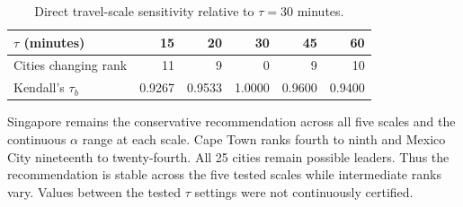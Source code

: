 \begin{table}[htbp]
\centering
\caption{Direct travel-scale sensitivity relative to $\tau=30$ minutes.}
\label{tab:t4sensitivity}
\begin{tabular}{lrrrrr}
\toprule
$\tau$ (minutes) & 15 & 20 & 30 & 45 & 60\\
\midrule
Cities changing rank & 11 & 9 & 0 & 9 & 10\\
Kendall's $\tau_b$ & 0.9267 & 0.9533 & 1.0000 & 0.9600 & 0.9400\\
\bottomrule
\end{tabular}
\end{table}

Singapore remains the conservative recommendation across all five scales
and the continuous $\alpha$ range at each scale. Cape Town ranks fourth
to ninth and Mexico City nineteenth to twenty-fourth. All 25 cities remain
possible leaders. Thus the recommendation is stable across the five tested
scales while intermediate ranks vary. Values between the tested $\tau$
settings were not continuously certified.
\clearpage
\endgroup
